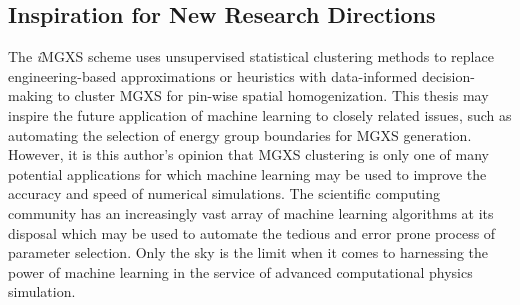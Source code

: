 \subsection{Inspiration for New Research Directions}
\label{subsec:chap12-inspiration}

The \textit{i}\ac{MGXS} scheme uses unsupervised statistical clustering methods to replace engineering-based approximations or heuristics with data-informed decision-making to cluster \ac{MGXS} for pin-wise spatial homogenization. This thesis may inspire the future application of machine learning to closely related issues, such as automating the selection of energy group boundaries for \ac{MGXS} generation. However, it is this author's opinion that \ac{MGXS} clustering is only one of many potential applications for which machine learning may be used to improve the accuracy and speed of numerical simulations. The scientific computing community has an increasingly vast array of machine learning algorithms at its disposal which may be used to automate the tedious and error prone process of parameter selection. Only the sky is the limit when it comes to harnessing the power of machine learning in the service of advanced computational physics simulation.

